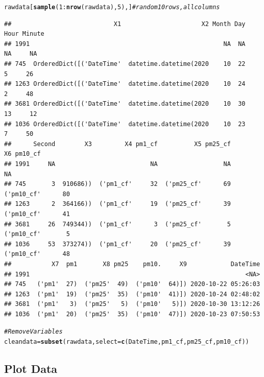 \documentclass{article}\usepackage[]{graphicx}\usepackage[]{color}
\makeatletter
\newcommand{\hlnum}[1]{\textcolor[rgb]{0.686,0.059,0.569}{#1}}%
\newcommand{\hlcom}[1]{\textcolor[rgb]{0.678,0.584,0.686}{\textit{#1}}}%
\newcommand{\hlopt}[1]{\textcolor[rgb]{0,0,0}{#1}}%
\newcommand{\hlstd}[1]{\textcolor[rgb]{0.345,0.345,0.345}{#1}}%
\newcommand{\hlkwb}[1]{\textcolor[rgb]{0.69,0.353,0.396}{#1}}%
\newcommand{\hlkwc}[1]{\textcolor[rgb]{0.333,0.667,0.333}{#1}}%
\newcommand{\hlkwd}[1]{\textcolor[rgb]{0.737,0.353,0.396}{\textbf{#1}}}%
\newenvironment{kframe}{%
 \def\at@end@of@kframe{}%
 \ifinner\ifhmode%
  \def\at@end@of@kframe{\end{minipage}}%
  \begin{minipage}{\columnwidth}%
 \fi\fi%
 \def\FrameCommand##1{\hskip\@totalleftmargin \hskip-\fboxsep
 \colorbox{shadecolor}{##1}\hskip-\fboxsep
     \hskip-\linewidth \hskip-\@totalleftmargin \hskip\columnwidth}%
 \MakeFramed {\advance\hsize-\width
   \@totalleftmargin\z@ \linewidth\hsize
   \@setminipage}}%
 {\par\unskip\endMakeFramed%
 \at@end@of@kframe}
\newenvironment{knitrout}{}{} %
\makeatother
\begin{document}
\begin{knitrout}
\color{fgcolor}\begin{kframe}
\begin{alltt}
\hlstd{rawdata[}\hlkwd{sample}\hlstd{(}\hlnum{1}\hlopt{:}\hlkwd{nrow}\hlstd{(rawdata),} \hlnum{5}\hlstd{),]} \hlcom{# random 10 rows, all columns}
\end{alltt}
\begin{verbatim}
##                            X1                      X2 Month Day Hour Minute
## 1991                                                     NA  NA   NA     NA
## 745  OrderedDict([('DateTime'  datetime.datetime(2020    10  22    5     26
## 1263 OrderedDict([('DateTime'  datetime.datetime(2020    10  24    2     48
## 3681 OrderedDict([('DateTime'  datetime.datetime(2020    10  30   13     12
## 1036 OrderedDict([('DateTime'  datetime.datetime(2020    10  23    7     50
##      Second        X3         X4 pm1_cf          X5 pm25_cf          X6 pm10_cf
## 1991     NA                          NA                  NA                  NA
## 745       3  910686))  ('pm1_cf'     32  ('pm25_cf'      69  ('pm10_cf'      80
## 1263      2  364166))  ('pm1_cf'     19  ('pm25_cf'      39  ('pm10_cf'      41
## 3681     26  749344))  ('pm1_cf'      3  ('pm25_cf'       5  ('pm10_cf'       5
## 1036     53  373274))  ('pm1_cf'     20  ('pm25_cf'      39  ('pm10_cf'      48
##           X7  pm1       X8 pm25    pm10.     X9            DateTime
## 1991                                                           <NA>
## 745   ('pm1'  27)  ('pm25'  49)  ('pm10'  64)]) 2020-10-22 05:26:03
## 1263  ('pm1'  19)  ('pm25'  35)  ('pm10'  41)]) 2020-10-24 02:48:02
## 3681  ('pm1'   3)  ('pm25'   5)  ('pm10'   5)]) 2020-10-30 13:12:26
## 1036  ('pm1'  20)  ('pm25'  35)  ('pm10'  47)]) 2020-10-23 07:50:53
\end{verbatim}
\begin{alltt}
\hlcom{# Remove Variables}
\hlstd{cleandata} \hlkwb{=} \hlkwd{subset}\hlstd{(rawdata,} \hlkwc{select}\hlstd{=}\hlkwd{c}\hlstd{(DateTime, pm1_cf, pm25_cf, pm10_cf))}
\end{alltt}
\end{kframe}
\end{knitrout}

\subsection{Plot Data}
\end{document}
